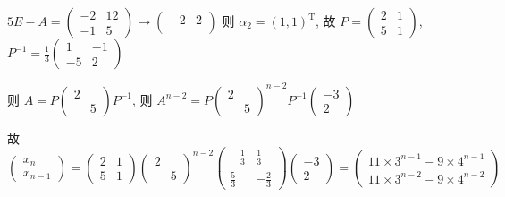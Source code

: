 		 \( 5E-A = \begin{pmatrix}
			 -2 & 12 \\
			 -1 & 5
		 \end{pmatrix} \rightarrow \begin{pmatrix}
			 -2 & 2 \\
			    &
		 \end{pmatrix} \) 则 \( \alpha_{2} = (1,1)^{\mathrm{T}} \), 故 \( P = \begin{pmatrix}
			 2 & 1 \\
			 5 & 1
		 \end{pmatrix} \), \( P^{-1} = \frac{1}{3}\begin{pmatrix}
			 1  & -1 \\
			 -5 & 2
		 \end{pmatrix} \)

		 则 \( A = P\begin{pmatrix}
			 2 &   \\
			   & 5
		 \end{pmatrix}P^{-1} \), 则 \( A^{n-2} = P
		 \begin{pmatrix}
			 2 &   \\
			   & 5
		 \end{pmatrix} ^{n-2}P^{-1}
		 \begin{pmatrix}
			 -3 \\
			 2
		 \end{pmatrix}  \)

		 故 \( \begin{pmatrix}
			 x_{n} \\
			 x_{n-1}
		 \end{pmatrix} = \begin{pmatrix}
			 2 & 1 \\
			 5 & 1
		 \end{pmatrix}\begin{pmatrix}
			 2 &   \\
			   & 5
		 \end{pmatrix}^{n-2}\begin{pmatrix}
			 -\frac{1}{3} & \frac{1}{3}  \\
			 \frac{5}{3}  & -\frac{2}{3}
		 \end{pmatrix}\begin{pmatrix}
			 -3 \\
			 2
		 \end{pmatrix} = \begin{pmatrix}
			 11\times3^{n-1}-9\times4^{n-1} \\
			 11\times3^{n-2}-9\times4^{n-2}
		 \end{pmatrix} \)

